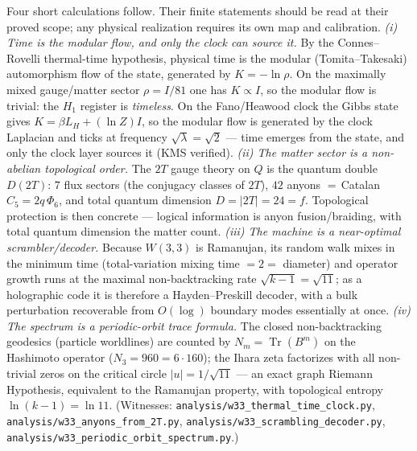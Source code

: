 \documentclass[11pt]{article}
\begin{document}
Four short calculations follow. Their finite statements should be read at their
proved scope; any physical realization requires its own map and calibration.
\emph{(i) Time is the modular flow, and only the clock can source it.} By the
Connes--Rovelli thermal-time hypothesis, physical time is the modular
(Tomita--Takesaki) automorphism flow of the state, generated by $K=-\ln\rho$. On
the maximally mixed gauge/matter sector $\rho=I/81$ one has $K\propto I$, so the
modular flow is trivial: the $H_1$ register is \emph{timeless}. On the Fano/Heawood
clock the Gibbs state gives $K=\beta L_H+(\ln Z)I$, so the modular flow is
generated by the clock Laplacian and ticks at frequency $\sqrt\lambda=\sqrt2$ ---
time emerges from the state, and only the clock layer sources it (KMS verified).
\emph{(ii) The matter sector is a non-abelian topological order.} The $2T$
gauge theory on $Q$ is the quantum double $D(2T)$: $7$ flux sectors (the conjugacy
classes of $2T$), $42$ anyons $=\,$Catalan $C_5=2q\,\Phi_6$, and total quantum
dimension $D=\lvert2T\rvert=24=f$. Topological protection is then concrete ---
logical information is anyon fusion/braiding, with total quantum dimension the
matter count. \emph{(iii) The machine is a near-optimal scrambler/decoder.}
Because $W(3,3)$ is Ramanujan, its random walk mixes in the minimum time
(total-variation mixing time $=2=$ diameter) and operator growth runs at the
maximal non-backtracking rate $\sqrt{k-1}=\sqrt{11}$; as a holographic code it is
therefore a Hayden--Preskill decoder, with a bulk perturbation recoverable from
$O(\log)$ boundary modes essentially at once. \emph{(iv) The spectrum is a
periodic-orbit trace formula.} The closed non-backtracking geodesics (particle
worldlines) are counted by $N_m=\operatorname{Tr}(B^m)$ on the Hashimoto operator
($N_3=960=6\cdot160$); the Ihara zeta factorizes with all non-trivial zeros on the
critical circle $\lvert u\rvert=1/\sqrt{11}$ --- an exact graph Riemann
Hypothesis, equivalent to the Ramanujan property, with topological entropy
$\ln(k-1)=\ln11$. (Witnesses:
\texttt{analysis/w33\_thermal\_time\_clock.py},
\texttt{analysis/w33\_anyons\_from\_2T.py},
\texttt{analysis/w33\_scrambling\_decoder.py},
\texttt{analysis/w33\_periodic\_orbit\_spectrum.py}.)
\end{document}
